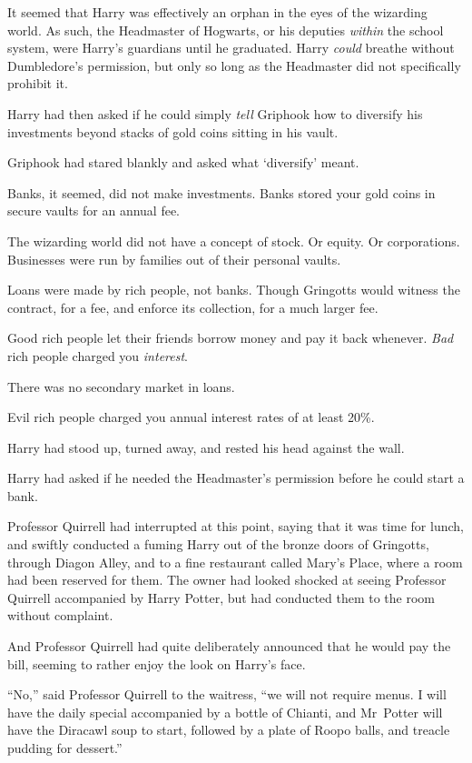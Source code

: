 It seemed that Harry was effectively an orphan in the eyes of the wizarding world. As such, the Headmaster of Hogwarts, or his deputies \emph{within} the school system, were Harry’s guardians until he graduated. Harry \emph{could} breathe without Dumbledore’s permission, but only so long as the Headmaster did not specifically prohibit it.

Harry had then asked if he could simply \emph{tell} Griphook how to diversify his investments beyond stacks of gold coins sitting in his vault.

Griphook had stared blankly and asked what ‘diversify’ meant.

Banks, it seemed, did not make investments. Banks stored your gold coins in secure vaults for an annual fee.

The wizarding world did not have a concept of stock. Or equity. Or corporations. Businesses were run by families out of their personal vaults.

Loans were made by rich people, not banks. Though Gringotts would witness the contract, for a fee, and enforce its collection, for a much larger fee.

Good rich people let their friends borrow money and pay it back whenever. \emph{Bad} rich people charged you \emph{interest}.

There was no secondary market in loans.

Evil rich people charged you annual interest rates of at least 20\%.

Harry had stood up, turned away, and rested his head against the wall.

Harry had asked if he needed the Headmaster’s permission before he could start a bank.

Professor Quirrell had interrupted at this point, saying that it was time for lunch, and swiftly conducted a fuming Harry out of the bronze doors of Gringotts, through Diagon Alley, and to a fine restaurant called Mary’s Place, where a room had been reserved for them. The owner had looked shocked at seeing Professor Quirrell accompanied by Harry Potter, but had conducted them to the room without complaint.

And Professor Quirrell had quite deliberately announced that he would pay the bill, seeming to rather enjoy the look on Harry’s face.

“No,” said Professor Quirrell to the waitress, “we will not require menus. I will have the daily special accompanied by a bottle of Chianti, and Mr~Potter will have the Diracawl soup to start, followed by a plate of Roopo balls, and treacle pudding for dessert.”

